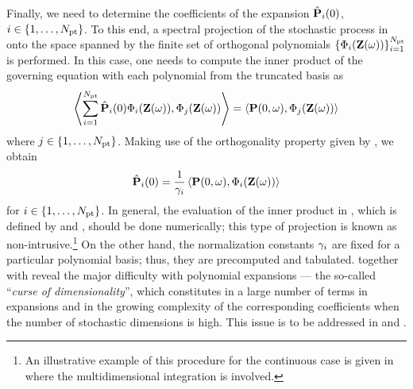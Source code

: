Finally, we need to determine the coefficients of the expansion $\hat{\mathbf{P}}_i(0)$, $i \in \{ 1, \dotsc, {N_\text{pt}} \}$. To this end, a spectral projection of the stochastic process in  onto the space spanned by the finite set of orthogonal polynomials $\{ \Phi_i(\mathbf{Z}(\omega)) \}_{i = 1}^{{N_\text{pt}}}$ is performed. In this case, one needs to compute the inner product of the governing equation  with each polynomial from the truncated basis as
\[
  \oInner{\sum_{i=1}^{\pcterms} \pcc{\vP}_i(0) \pcb_i(\vZ(\o))}{\pcb_j(\vZ(\o))} = \oInner{\vP(0, \o)}{\pcb_j(\vZ(\o))}
\]
where $j \in \{ 1, \dotsc, {N_\text{pt}} \}$. Making use of the orthogonality property given by , we obtain
\begin{equation} \elabel{pc-coefficients}
  \pcc{\vP}_i(0) = \frac{1}{\pcn_i} \oInner{\vP(0, \o)}{\pcb_i(\vZ(\o))}
\end{equation}
for $i \in \{ 1, \dotsc, {N_\text{pt}} \}$. In general, the evaluation of the inner product in , which is defined by  and , should be done numerically; this type of projection is known as non-intrusive.\footnote{An illustrative example of this procedure for the continuous case is given in  where the multidimensional integration is involved.} On the other hand, the normalization constants $\gamma_i$ are fixed for a particular polynomial basis; thus, they are precomputed and tabulated.  together with  reveal the major difficulty with polynomial expansions --- the so-called ``\emph{curse of dimensionality}'', which constitutes in a large number of terms in expansions and in the growing complexity of the corresponding coefficients when the number of stochastic dimensions is high. This issue is to be addressed in  and .

